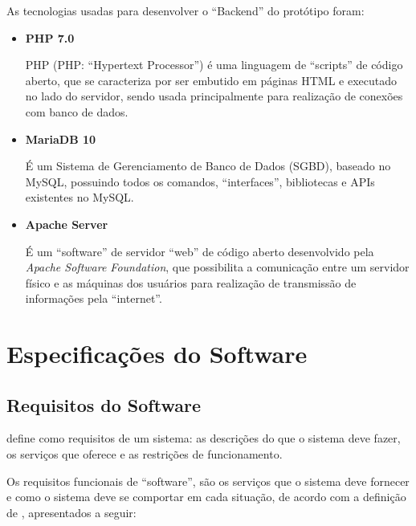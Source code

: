 As tecnologias usadas para desenvolver o “Backend” do protótipo foram:
\begin{itemize}
    \item[] \textbf{PHP 7.0}
       
    PHP (PHP: “Hypertext Processor”) é uma linguagem de “scripts” de código aberto, que se caracteriza por ser embutido em páginas HTML e executado no lado do servidor, sendo usada principalmente para realização de conexões com banco de dados. 
   
    \item[] \textbf{MariaDB 10}
     
     É um Sistema de Gerenciamento de Banco de Dados (SGBD), baseado no MySQL, possuindo todos os comandos, “interfaces”, bibliotecas e APIs existentes no MySQL.
   
    \item[] \textbf{Apache Server}
      
    É um “software” de servidor “web” de código aberto desenvolvido pela \emph{Apache Software Foundation}, que possibilita a comunicação entre um servidor físico e as máquinas dos usuários para realização de transmissão de informações pela “internet”.
   
\end{itemize}

\section{Especificações do Software}



\subsection{Requisitos do Software}

 define como requisitos de um sistema: as descrições do que o sistema deve fazer, os serviços que oferece e as restrições de funcionamento.

Os requisitos funcionais de “software”, são os serviços que o sistema deve fornecer e como o sistema deve se comportar em cada situação, de acordo com a definição de , apresentados a seguir:


